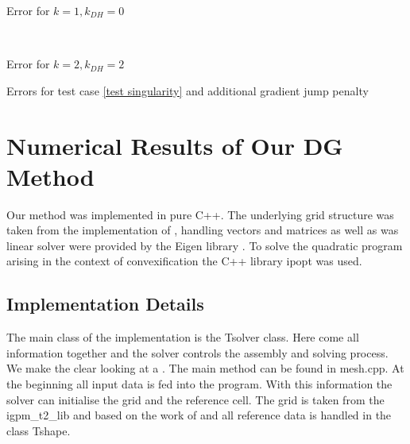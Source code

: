 \begin{table}[H]
\begin{subtable}[b]{0.45\textwidth}
  	\centering
  	\pgfplotstabletypeset[columns={iterations, l2error, h1error,N},
  	every row 0 column 0/.style={set content=init},
  	]{\MAThreeJumpdegOneZero}
  	\caption{Error for $k=1, k_{DH}=0$}
  \end{subtable}
  ~
	\begin{subtable}[b]{0.45\textwidth}
		\centering
		  		\pgfplotstabletypeset[
		columns={iterations, l2error, h1error,N},
		    every row 0 column 0/.style={set content=init},
		]{\MAThreeJumpdegTwoTwo}
    	\caption{Error for $k=2, k_{DH}=2$}
   \end{subtable}
 	\caption{Errors for test case \ref{test singularity} and additional gradient jump penalty}
	\label{tab: l2 errors test 3 jump}
\end{table}




\newpage

\section{Numerical Results of Our DG Method}

Our method was implemented in pure C++. The underlying grid structure was taken from the implementation of \cite{BMV2009}, handling vectors and matrices as well as was linear solver were provided by the Eigen library \cite{eigenweb}. To solve the quadratic program arising in the context of convexification the C++ library ipopt \cite{ipopt} was used.


\subsection{Implementation Details}

The main class of the implementation is the Tsolver class. Here come all information together and the solver controls the assembly and solving process. 
We make the clear looking at a . The main method can be found in mesh.cpp. At the beginning all input data is fed into the program. With this information the solver can initialise the grid and the reference cell. 
The grid is taken from the igpm\_t2\_lib and based on the work of \cite{BMV2009} and all reference data is handled in the class Tshape.

